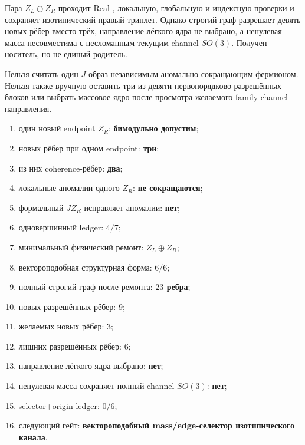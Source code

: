 \begin{proposition}
Пара $Z_L\oplus Z_R$ проходит Real-, локальную, глобальную и индексную
проверки и сохраняет изотипический правый триплет. Однако строгий граф
разрешает девять новых рёбер вместо трёх, направление лёгкого ядра не
выбрано, а ненулевая масса несовместима с несломанным текущим
channel-$SO(3)$. Получен носитель, но не единый родитель.
\end{proposition}

\begin{nogocriterion}
Нельзя считать один $J$-образ независимым аномально сокращающим фермионом.
Нельзя также вручную оставить три из девяти первопорядково разрешённых
блоков или выбрать массовое ядро после просмотра желаемого family-channel
направления.
\end{nogocriterion}

\begin{protocol}\begin{enumerate}
\item один новый endpoint $Z_R$: \textbf{бимодульно допустим};
\item новых рёбер при одном endpoint: \textbf{три};
\item из них coherence-рёбер: \textbf{два};
\item локальные аномалии одного $Z_R$: \textbf{не сокращаются};
\item формальный $JZ_R$ исправляет аномалии: \textbf{нет};
\item одновершинный ledger: \textbf{$4/7$};
\item минимальный физический ремонт: \textbf{$Z_L\oplus Z_R$};
\item вектороподобная структурная форма: \textbf{$6/6$};
\item полный строгий граф после ремонта: \textbf{$23$ ребра};
\item новых разрешённых рёбер: \textbf{$9$};
\item желаемых новых рёбер: \textbf{$3$};
\item лишних разрешённых рёбер: \textbf{$6$};
\item направление лёгкого ядра выбрано: \textbf{нет};
\item ненулевая масса сохраняет полный channel-$SO(3)$: \textbf{нет};
\item selector+origin ledger: \textbf{$0/6$};
\item следующий гейт: \textbf{вектороподобный mass/edge-селектор изотипического канала}.
\end{enumerate}\end{protocol}

